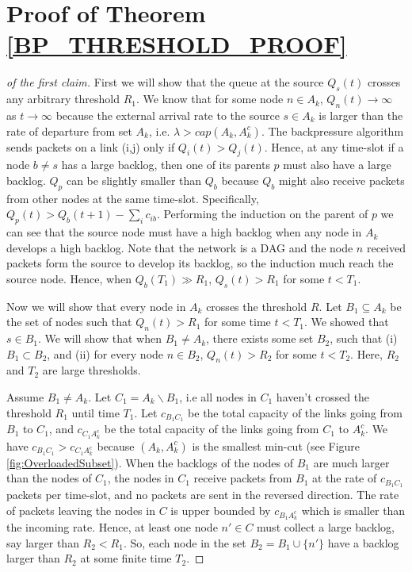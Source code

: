 \documentclass{sig-alternate-2013}
\begin{document}
\section{Proof of Theorem \ref{BP_THRESHOLD_PROOF}}\label{app:bpThresholdProof}
\begin{proof}[of the first claim]
First we will show that the queue at the source $Q_s(t)$ crosses any arbitrary threshold $R_1$. We know that for some node $n\in A_k$, $Q_n(t) \rightarrow \infty$ as $t \rightarrow \infty$ because the external arrival rate to the source $s\in A_k$ is larger than the rate of departure from set $A_k$, i.e. $\lambda > cap(A_k,A_k^c)$. The backpressure algorithm sends packets on a link (i,j) only if $Q_i(t) > Q_j(t)$. Hence, at any time-slot if a node $b \ne s$ has a large backlog, then one of its parents $p$ must also have a large backlog. $Q_p$ can be slightly smaller than $Q_b$ because $Q_b$ might also receive packets from other nodes at the same time-slot. Specifically, $Q_p(t) > Q_b(t+1)-\sum_i c_{ib}$. Performing the induction on the parent of $p$ we can see that the source node must have a high backlog when any node in $A_k$ develops a high backlog. Note that the network is a DAG and the node $n$ received packets form the source to develop its backlog, so the induction much reach the source node. Hence, when $Q_b(T_1) \gg R_1$, $Q_s(t) > R_1$ for some $t<T_1$.



Now we will show that every node in $A_k$ crosses the threshold $R$. Let $B_1 \subseteq A_k$ be the set of nodes such that $Q_n(t)>R_1$ for some time $t<T_1$. We showed that $s\in B_1$. We will show that when $B_1 \ne A_k$, there exists some set $B_2$, such that  (i) $B_1 \subset B_2$, and (ii) for every node $n \in B_2$, $Q_n(t) > R_2$ for some $t < T_2$. Here, $R_2$ and $T_2$ are large thresholds.

Assume $B_1 \ne A_k$. Let $C_1=A_k\backslash B_1$, i.e all nodes in $C_1$ haven't crossed the threshold $R_1$ until time $T_1$. 
Let $c_{B_1C_1}$ be the total capacity of the links going from $B_1$ to $C_1$, and $c_{C_1A_k^c}$ be the total capacity of the links going from $C_1$ to $A_k^c$. We have $c_{B_1C_1}>c_{C_1A_k^c}$ because $(A_k,A_k^c)$ is the smallest min-cut (see Figure \ref{fig:OverloadedSubset}). When the backlogs of the nodes of $B_1$ are much larger than the nodes of $C_1$, the nodes in $C_1$ receive packets from $B_1$ at the rate of $c_{B_1C_1}$ packets per time-slot, and no packets are sent in the reversed direction. The rate of packets leaving the nodes in $C$ is upper bounded by $c_{B_1A_k^c}$ which is smaller than the incoming rate. Hence, at least one node $n' \in C$ must collect a large backlog, say larger than $R_2<R_1$. So, each node in the set $B_2 = B_1 \cup \{n'\}$ have a backlog larger than $R_2$ at some finite time $T_2$.



\end{proof}
\end{document}
